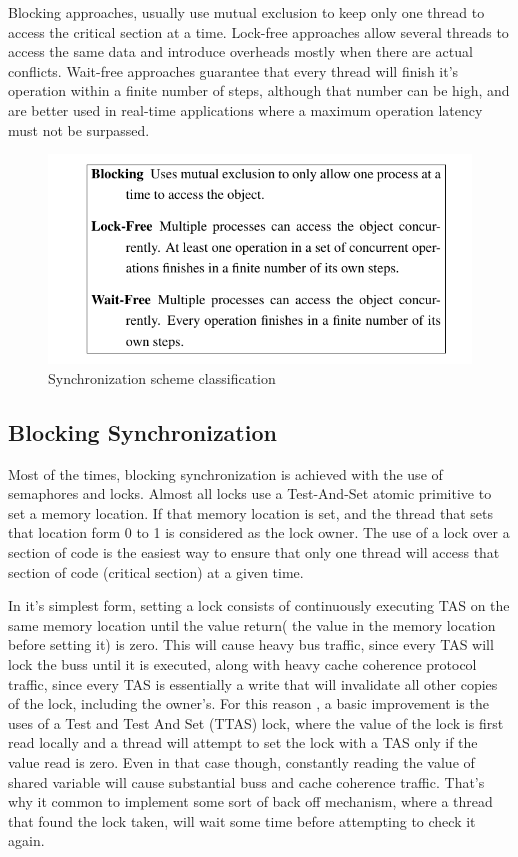 Blocking approaches, usually use mutual exclusion to keep only one thread to access the critical section at a time. Lock-free approaches allow several threads to access the same data and introduce overheads mostly when there are actual conflicts. Wait-free approaches guarantee that every thread will finish it's operation within a finite number of steps, although that number can be high, and are better used in real-time applications where a maximum operation latency must not be surpassed. 
 
 \begin{figure}

 \centering

  \includegraphics[scale=0.5]{progress_gar.png}

\caption{Synchronization scheme classification}

\label{progress_gar}

\end{figure}


\subsection{Blocking Synchronization}

Most of the times, blocking synchronization is achieved with the use of semaphores and locks. Almost all locks use a Test-And-Set atomic primitive to set a memory location. If that memory location is set,  and the thread that sets that location form 0 to 1 is considered as the lock owner. The use of a lock over a section of code is the easiest way to ensure that only one thread will access that section of code (critical section) at a given time.

In it's simplest form, setting a lock consists of  continuously executing TAS on the same memory location until the value return( the value in the memory location before setting it) is zero. This will cause heavy bus traffic, since every TAS will lock the buss until it is executed, along with heavy cache coherence protocol traffic, since every TAS is essentially a write that will invalidate all other copies of the lock, including the owner's. For this reason , a basic improvement is the uses of a Test and Test And Set (TTAS) lock, where the value of the lock is first read locally and a thread will attempt to set the lock with a TAS only if the value read is zero. Even in that case though, constantly reading the value of shared variable will cause substantial buss and cache coherence traffic. That's why it common to implement some sort of back off mechanism, where a thread that found the lock taken, will wait some time before attempting to check it again.

